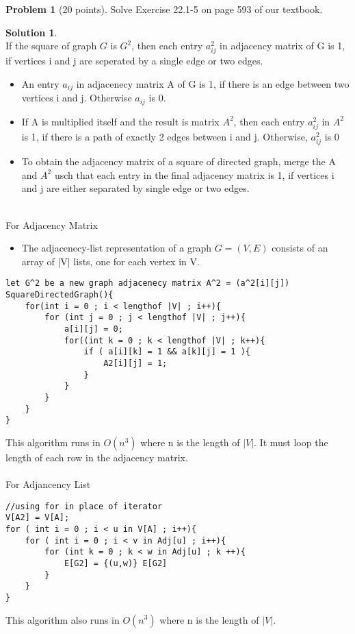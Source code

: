 \documentclass{article}
\theoremstyle{definition}
\newtheorem{problem}{Problem}
\newtheorem*{solution}{Solution}
\begin{document}
\begin{problem}[20 points]
Solve Exercise 22.1-5 on page 593 of our textbook. 
\end{problem}
\begin{solution} \\
If the square of graph $G$ is $G^2$, then each entry $a^2_{ij}$ in adjacency matrix of G is 1, if vertices i and j are seperated by a single edge or two edges.
\begin{itemize}
\item An entry $a_{ij}$ in adjacenecy matrix A of G is 1, if there is an edge between two vertices i and j. Otherwise $a_{ij}$ is 0.
\item If A is multiplied itself and the result is matrix $A^2$, then each entry $a^2_{ij}$ in $A^2$ is 1, if there is a path of exactly 2 edges between i and j. Otherwise, $a^2_{ij}$ is 0
\item To obtain the adjacency matrix of a square of directed graph, merge the A and $A^2$ usch that each entry in the final adjacency matrix is 1, if vertices i and j are either separated by single edge or two edges.
\end{itemize}
\\
For Adjacency Matrix
\begin{itemize}
    \item The adjacenecy-list representation of a graph $G=(V,E)$ consists of an array of |V| lists, one for each vertex in V.
\end{itemize}
\begin{verbatim}
let G^2 be a new graph adjacenecy matrix A^2 = (a^2[i][j])
SquareDirectedGraph(){
    for(int i = 0 ; i < lengthof |V| ; i++){
        for (int j = 0 ; j < lengthof |V| ; j++){
            a[i][j] = 0;
            for((int k = 0 ; k < lengthof |V| ; k++){
                if ( a[i][k] = 1 && a[k][j] = 1 ){
                    A2[i][j] = 1;
                }
            }
        }
    }
}
\end{verbatim}
This algorithm runs in $O(n^3)$ where n is the length of $|V|$. It must loop the length of each row in the adjacency matrix.\\
\\
For Adjancency List
\begin{verbatim}
//using for in place of iterator
V[A2] = V[A];
for ( int i = 0 ; i < u in V[A] ; i++){
    for ( int i = 0 ; i < v in Adj[u] ; i++){
        for (int k = 0 ; k < w in Adj[u] ; k ++){
            E[G2] = {(u,w)} E[G2]
        }
    }
}
\end{verbatim}
This algorithm also runs in $O(n^3)$ where n is the length of $|V|$.\\

\end{solution}
\end{document}
